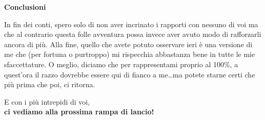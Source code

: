 \documentclass[12pt, a4paper]{article}
\begin{document}
\textbf{Conclusioni}

In fin dei conti, spero solo di non aver incrinato i rapporti con nessuno di voi ma che al contrario questa folle avventura possa invece aver avuto modo di rafforzarli ancora di più.
Alla fine, quello che avete potuto osservare ieri è una versione di me che (per fortuna o purtroppo) mi rispecchia abbastanza bene in tutte le mie sfaccettature.
O meglio, diciamo che per rappresentami proprio al 100\%, a quest'ora il razzo dovrebbe essere qui di fianco a me\dots ma potete starne certi che più prima che poi, ci ritorna.

\begin{center}
    \huge E con i più intrepidi di voi,\\
    \textbf{ci vediamo alla prossima rampa di lancio!}
\end{center}
\end{document}
